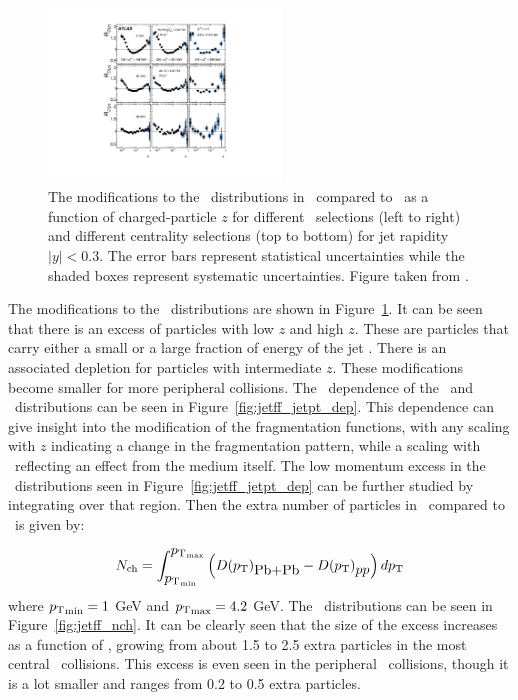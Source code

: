 \begin{figure}[htbp]
\begin{center}
\includegraphics[width=0.55\textwidth]{figures/jetMeasurements/jetff_rdz}
\caption{The modifications to the \Dz\ distributions in \pbpb\ compared to \pp\ as a function of charged-particle $z$ for different \ptjet\ selections (left to right) and different centrality selections (top to bottom) for jet rapidity $|y| < 0.3$. The error bars represent statistical uncertainties while the shaded boxes represent systematic uncertainties. Figure taken from \cite{PhysRevC.98.024908}.}
\label{fig:jetff_rdz}
\end{center}
\end{figure}

The modifications to the \Dz\ distributions are shown in Figure~\ref{fig:jetff_rdz}. It can be seen that there is an excess of particles with low $z$ and high $z$. These are particles that carry either a small or a large fraction of energy of the jet \pt. There is an associated depletion for particles with intermediate $z$. These modifications become smaller for more peripheral collisions. The \ptjet\ dependence of the \Rdz\ and \Rdpt\ distributions can be seen in Figure~\ref{fig:jetff_jetpt_dep}. This dependence can give insight into the modification of the fragmentation functions, with any scaling with $z$ indicating a change in the fragmentation pattern, while a scaling with \pt\ reflecting an effect from the medium itself. The low momentum excess in the \Rdpt\ distributions seen in Figure~\ref{fig:jetff_jetpt_dep} can be further studied by integrating over that region. Then the extra number of particles in \pbpb\ compared to \pp\ is given by:

\begin{align}
\mbox{$N_{\mathrm{ch}}$} = \int^{\mbox{$p_{\mathrm{T}}$}_{\mathrm{max}}}_{\mbox{$p_{\mathrm{T}}$}_{\mathrm{min}}} \left( \mbox{$D(\mbox{$p_{\mathrm{T}}$})$}_{\mbox{Pb+Pb}} - \mbox{$D(\mbox{$p_{\mathrm{T}}$})$}_{\mbox{$pp$}} \right) d\mbox{$p_{\mathrm{T}}$}
\end{align}
where $\mbox{$p_{\mathrm{T}}$}_{\mathrm{min}} = 1$ GeV and $\mbox{$p_{\mathrm{T}}$}_{\mathrm{max}} = 4.2$ GeV. The \Nch\ distributions can be seen in Figure~\ref{fig:jetff_nch}. It can be clearly seen that the size of the excess increases as a function of \ptjet, growing from about 1.5 to 2.5 extra particles in the most central \pbpb\ collisions. This excess is even seen in the peripheral \pbpb\ collisions, though it is a lot smaller and ranges from 0.2 to 0.5 extra particles. 



